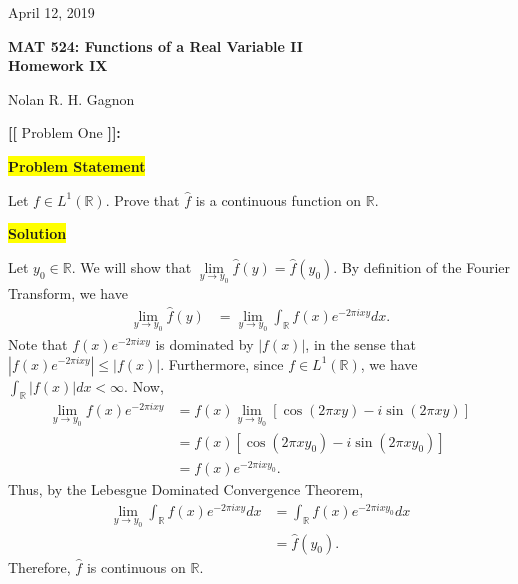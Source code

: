 \documentclass[12pt]{article}
\newcommand{\mybox}{%
    \collectbox{%
        \setlength{\fboxsep}{2pt}%
        \fbox{\BOXCONTENT}%
    }%
}
\begin{document}
\hfill April 12, 2019
\begin{center}
\begin{large}
\textbf{MAT 524: Functions of a Real Variable II \\
\vspace{-5mm}
Homework IX \\}
\end{large}
\vspace{-2mm}
Nolan R. H. Gagnon \\
\end{center}
\vspace{-0.5cm}
\noindent \textbf{{\huge [}{\Large [}} Problem One \textbf{{\Large ]}{\huge ]}}{\Large \textbf{:}}

\vspace{3mm}

\noindent\mybox{\colorbox{yellow}{\textbf{Problem Statement}}}\hspace{3mm}\hrulefill

\noindent Let $f\in L^{1}(\mathbb{R}).$ Prove that $\hat{f}$ is a continuous function on $\mathbb{R}$.

\noindent\mybox{\colorbox{yellow}{\textbf{Solution}}}\hspace{3mm}\hrulefill

\noindent Let $y_0\in\mathbb{R}$. We will show that $\lim\limits_{y\rightarrow y_0} \hat{f}(y) = \hat{f}(y_0).$ By definition of the Fourier Transform, we have
\begin{align}
    \lim\limits_{y\rightarrow y_0} \hat{f}(y) &= \lim\limits_{y\rightarrow y_0}\int_{\mathbb{R}} f(x) e^{-2\pi i x y} dx. \label{eq1.1}
\end{align}
Note that $f(x)e^{-2\pi ix y}$ is dominated by $|f(x)|$, in the sense that $\left|f(x)e^{-2\pi ixy}\right|\leq |f(x)|$. Furthermore, since $f \in L^1(\mathbb{R})$, we have $\int_{\mathbb{R}} |f(x)| dx < \infty.$ Now,
\begin{align}
    \lim_{y\rightarrow y_0} f(x)e^{-2\pi ixy} &= f(x)\lim_{y\rightarrow y_0}\left[\cos(2\pi xy) -i\sin(2\pi x y)\right] \\
    &= f(x)\left[\cos(2\pi x y_0) - i \sin(2\pi x y_0)\right] \\
    &= f(x)e^{-2\pi i x y_0}.
\end{align}
Thus, by the Lebesgue Dominated Convergence Theorem,
\begin{align}
    \lim_{y\rightarrow y_0}\int_{\mathbb{R}}f(x)e^{-2\pi i x y} dx &= \int_{\mathbb{R}} f(x) e^{-2\pi ix y_0}dx \\
    &= \hat{f}(y_0).
\end{align}
Therefore, $\hat{f}$ is continuous on $\mathbb{R}.$
\end{document}
